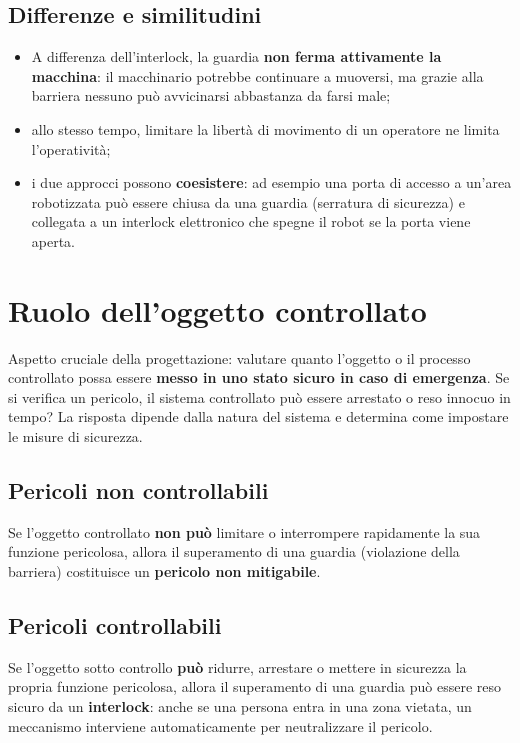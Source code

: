 \subsection{Differenze e similitudini}
\begin{itemize}
    \item A differenza dell'interlock, la guardia \textbf{non ferma attivamente la macchina}: il macchinario potrebbe continuare a muoversi, ma grazie alla barriera nessuno può avvicinarsi abbastanza da farsi male;
    \item allo stesso tempo, limitare la libertà di movimento di un operatore ne limita l'operatività;
    \item i due approcci possono \textbf{coesistere}: ad esempio una porta di accesso a un'area robotizzata può essere chiusa da una guardia (serratura di sicurezza) e collegata a un interlock elettronico che spegne il robot se la porta viene aperta.
\end{itemize}

\section{Ruolo dell'oggetto controllato}
Aspetto cruciale della progettazione: valutare quanto l'oggetto o il processo controllato possa essere \textbf{messo in uno stato sicuro in caso di emergenza}. Se si verifica un pericolo, il sistema controllato può essere arrestato o reso innocuo in tempo? La risposta dipende dalla natura del sistema e determina come impostare le misure di sicurezza.

\subsection{Pericoli non controllabili}
Se l'oggetto controllato \textbf{non può} limitare o interrompere rapidamente la sua funzione pericolosa, allora il superamento di una guardia (violazione della barriera) costituisce un \textbf{pericolo non mitigabile}.

\subsection{Pericoli controllabili}
Se l'oggetto sotto controllo \textbf{può} ridurre, arrestare o mettere in sicurezza la propria funzione pericolosa, allora il superamento di una guardia può essere reso sicuro da un \textbf{interlock}: anche se una persona entra in una zona vietata, un meccanismo interviene automaticamente per neutralizzare il pericolo.

